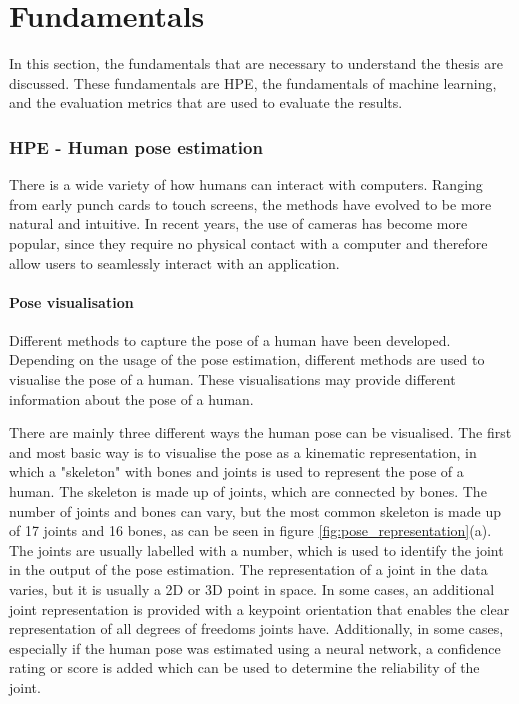 \chapter{Fundamentals}
\label{sec:fundamentals}

In this section, the fundamentals that are necessary to understand the thesis are discussed. These fundamentals are HPE, the fundamentals of machine learning, and the evaluation metrics that are used to evaluate the results. 

\subsection{HPE - Human pose estimation}

There is a wide variety of how humans can interact with computers. Ranging from early punch cards to touch screens, the methods have evolved to be more natural and intuitive. In recent years, the use of cameras has become more popular, since they require no physical contact with a computer and therefore allow users to seamlessly interact with an application.

\subsubsection{Pose visualisation}

Different methods to capture the pose of a human have been developed. Depending on the usage of the pose estimation, different methods are used to visualise the pose of a human. These visualisations may provide different information about the pose of a human.

There are mainly three different ways the human pose can be visualised. The first and most basic way is to visualise the pose as a kinematic representation, in which a "skeleton" with bones and joints is used to represent the pose of a human. The skeleton is made up of joints, which are connected by bones. The number of joints and bones can vary, but the most common skeleton is made up of 17 joints and 16 bones, as can be seen in figure \ref{fig:pose_representation}(a). The joints are usually labelled with a number, which is used to identify the joint in the output of the pose estimation. The representation of a joint in the data varies, but it is usually a 2D or 3D point in space. In some cases, an additional joint representation is provided with a keypoint orientation that enables the clear representation of all degrees of freedoms joints have\cite{KeypointOrientation}. Additionally, in some cases, especially if the human pose was estimated using a neural network, a confidence rating or score is added which can be used to determine the reliability of the joint.

